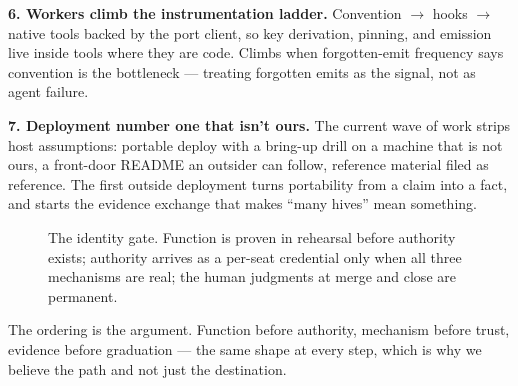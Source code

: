 \textbf{6. Workers climb the instrumentation ladder.} Convention $\to$ hooks $\to$ native tools backed by the port client, so key derivation, pinning, and emission live inside tools where they are code. Climbs when forgotten-emit frequency says convention is the bottleneck --- treating forgotten emits as the signal, not as agent failure.

\textbf{7. Deployment number one that isn't ours.} The current wave of work strips host assumptions: portable deploy with a bring-up drill on a machine that is not ours, a front-door README an outsider can follow, reference material filed as reference. The first outside deployment turns portability from a claim into a fact, and starts the evidence exchange that makes ``many hives'' mean something.

\begin{figure}[h]
\centering
{}
\caption{The identity gate. Function is proven in rehearsal before authority exists; authority arrives as a per-seat credential only when all three mechanisms are real; the human judgments at merge and close are permanent.}
\end{figure}

The ordering is the argument. Function before authority, mechanism before trust, evidence before graduation --- the same shape at every step, which is why we believe the path and not just the destination.
